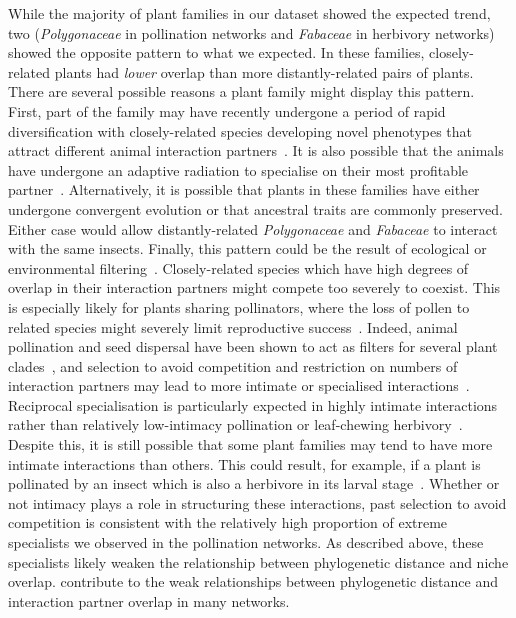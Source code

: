 \documentclass[12pt]{article}
\begin{document}
\begin{spacing}{1.5}
  While the majority of plant families in our dataset showed the expected trend, two (\emph{Polygonaceae} in pollination networks and \emph{Fabaceae} in herbivory networks) showed the opposite 
  pattern to what we expected. In these families, closely-related plants had 
  \emph{lower} overlap than more distantly-related pairs of plants. 
  There are several possible reasons a plant family might
  display this pattern. First, part of the family may have recently 
  undergone a period of rapid diversification with closely-related species 
  developing novel phenotypes that attract different animal 
  interaction partners~\citep{Linder2008,Breitkopf2015}. It is also possible that the
  animals have undergone an adaptive radiation to 
  specialise on their most profitable partner~\citep{Janz2006}. 
  Alternatively, it is possible that plants in these families have either undergone convergent evolution or that ancestral traits are commonly preserved. Either case would allow distantly-related \emph{Polygonaceae} and \emph{Fabaceae} to
  interact with the same insects. 
  Finally, this pattern 
  could be the result of ecological or environmental 
  filtering~\citep{Ackerly2003,Mayfield2009}. 
  Closely-related species which have high degrees of overlap in their interaction 
  partners might compete too severely to coexist. This is especially likely
  for plants sharing pollinators, where the loss of pollen to related species 
  might severely limit reproductive success~\citep{Levin1970,Bell2005,Mitchell2009}.
  Indeed, animal pollination and seed dispersal have been shown to act
  as filters for several plant clades~\citep{Mayfield2009}, and selection to avoid 
  competition and restriction on numbers of interaction partners may lead to
  more intimate or specialised interactions~\citep{Ponisio2017}. 
  Reciprocal specialisation is particularly expected in highly intimate interactions~\citep{Hembry2018} rather than relatively low-intimacy pollination or leaf-chewing herbivory~\citep{Astegiano2017}.
  Despite this, it is still possible that some plant families may tend to have more intimate interactions than others. This could result, for example, if a plant is pollinated by an insect which is also a herbivore in its larval stage~\citep{Hembry2018}. 
  Whether or not intimacy plays a role in structuring these interactions, past selection to avoid competition is 
  consistent with the relatively high proportion of extreme specialists we
  observed in the pollination networks. As described above, these specialists likely weaken the relationship between phylogenetic distance and niche overlap. contribute to the weak
  relationships between phylogenetic distance and interaction partner overlap
  in many networks. 



\end{spacing}
\end{document}
